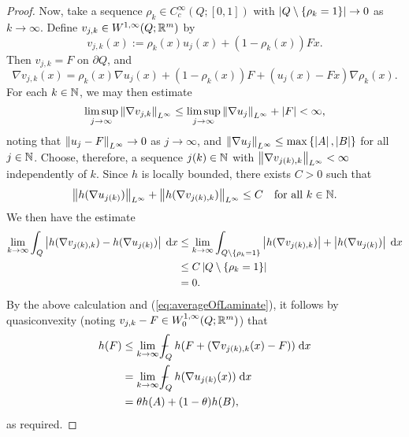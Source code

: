 \begin{proof}
    Now, take a sequence $\rho_k \in C_c^\infty(Q;[0,1])$ with $\left\lvert {Q \setminus \left\{ {\rho_k = 1} \right\}} \right\rvert \to 0$ as $k \to \infty$. Define $v_{j,k} \in W^{1,\infty}(Q;\mathbb{R}^m)$ by 
    \begin{equation}
        v_{j,k}(x) := \rho_k(x)u_j(x) + (1-\rho_k(x)) Fx.
    \end{equation}
    Then $v_{j,k} = F$ on $\partial Q$, and
    \begin{equation}
        \nabla v_{j,k}(x) = \rho_k(x) \nabla u_j(x) + (1-\rho_k(x)) F + (u_j(x) - Fx) \nabla\rho_k(x).
    \end{equation}
    For each $k \in \mathbb{N}$, we may then estimate 
    \begin{equation}
        \limsup_{j \to \infty} \left\lVert {\nabla v_{j,k}} \right\rVert_{L^\infty} \leq \limsup_{j \to \infty} \left\lVert {\nabla u_j} \right\rVert_{L^\infty} + \left\lvert {F} \right\rvert < \infty,
    \end{equation}
    noting that $\left\lVert {u_j - F} \right\rVert_{L^\infty} \to 0$ as $j \to \infty$, and $\left\lVert {\nabla u_j} \right\rVert_{L^\infty} \leq \max\left\{ {\left\lvert {A} \right\rvert,\left\lvert {B} \right\rvert} \right\}$ for all $j \in \mathbb{N}$. Choose, therefore, a sequence $j(k) \in \mathbb{N}$ with $\left\lVert {\nabla v_{j(k),k}} \right\rVert_{L^\infty} < \infty$ independently of $k$. Since $h$ is locally bounded, there exists $C > 0$ such that 
    \begin{equation}
        \left\lVert {h(\nabla u_{j(k)})} \right\rVert_{L^\infty} + \left\lVert {h(\nabla v_{j(k),k})} \right\rVert_{L^\infty} \leq C \quad \text{for all } k \in \mathbb{N}.
    \end{equation}
    We then have the estimate 
    \begin{equation} \begin{aligned}
        \lim_{k \to \infty} \int_Q \left\lvert {h(\nabla v_{j(k),k}) - h(\nabla u_{j(k)})} \right\rvert \; \mathrm{d} x
        &\leq \lim_{k \to \infty} \int_{Q \setminus \left\{ {\rho_k = 1} \right\}} \left\lvert {h(\nabla v_{j(k),k})} \right\rvert + \left\lvert {h(\nabla u_{j(k)})} \right\rvert \; \mathrm{d} x \\
        &\leq C\left\lvert {Q \setminus \left\{ {\rho_k = 1} \right\}} \right\rvert \\
        &= 0.
    \end{aligned} \end{equation}
    By the above calculation and (\ref{eq:averageOfLaminate}), it follows by quasiconvexity (noting $v_{j,k} - F \in W_0^{1,\infty}(Q;\mathbb{R}^m)$) that 
    \begin{equation} \begin{aligned}
        h(F) &\leq \lim_{k \to \infty} \dashint_Q h(F + (\nabla v_{j(k),k}(x) - F)) \; \d x \\
             &= \lim_{k \to \infty} \dashint_Q h(\nabla u_{j(k)}(x)) \; \d x \\
             &= \theta h(A) + (1-\theta) h(B),
    \end{aligned} \end{equation}
    as required.
\end{proof}
